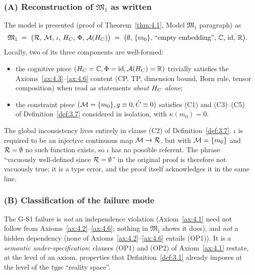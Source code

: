 \subsubsection*{(A) Reconstruction of \texorpdfstring{$\mathfrak{M}_1$}{M\_1}
  as written}

The model is presented (proof of Theorem~\ref{thm:4.1}, Model
$\mathfrak{M}_1$ paragraph) as
\[
  \mathfrak{M}_1 \;=\; \bigl(\mathcal{R},\,\mathcal{M},\,\iota,\,H_C,\,\Phi,\,\mathcal{A}(H_C)\bigr)
  \;=\; \bigl(\emptyset,\,\{m_0\},\,\text{``empty embedding''},\,
                \mathbb{C},\,\mathrm{id},\,\mathbb{R}\bigr).
\]
Locally, two of its three components are well-formed:
\begin{itemize}
  \item the cognitive piece $(H_C = \mathbb{C},\Phi=\mathrm{id},
    \mathcal{A}(H_C)=\mathbb{R})$ trivially satisfies the
    Axioms~\ref{ax:4.3}--\ref{ax:4.6} content (CP, TP, dimension
    bound, Born rule, tensor composition) when read as statements
    \emph{about $H_C$ alone};
  \item the constraint piece $(\mathcal{M}=\{m_0\},g\equiv 0,\hat{C}\equiv 0)$
    satisfies (C1) and (C3)--(C5) of
    Definition~\ref{def:3.7} considered in isolation, with
    $\kappa(m_0)=0$.
\end{itemize}
The global inconsistency lives entirely in clause (C2) of
Definition~\ref{def:3.7}: $\iota$ is required to be an injective
continuous map $\mathcal{M} \to \mathcal{R}$, but with $\mathcal{M}=\{m_0\}$ and
$\mathcal{R}=\emptyset$ no such function exists, so $\iota$ has no possible
referent.  The phrase ``vacuously well-defined since $\mathcal{R}=\emptyset$''
in the original proof is therefore not vacuously true; it is a
type error, and the proof itself acknowledges it in the same line.

\subsubsection*{(B) Classification of the failure mode}

The G-S1 failure is \emph{not} an independence violation
(Axiom~\ref{ax:4.1} need not follow from
Axioms~\ref{ax:4.2}--\ref{ax:4.6}; nothing in $\mathfrak{M}_1$ shows
it does), and \emph{not} a hidden dependency
(none of Axioms~\ref{ax:4.2}--\ref{ax:4.6} entails (OP1)).  It is a
\emph{semantic under-specification}: clauses (OP1) and (OP2) of
Axiom~\ref{ax:4.1} restate, at the level of an axiom, properties
that Definition~\ref{def:3.1} already imposes at the level of the
\emph{type} ``reality space''.

